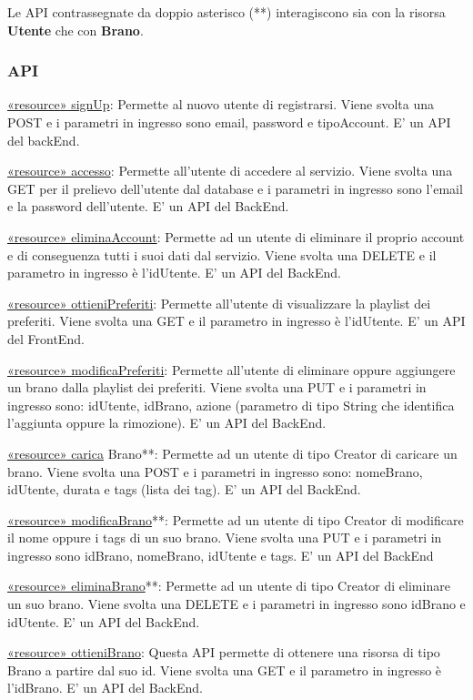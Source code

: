 \documentclass[a4paper,12pt]{article}
\begin{document}
Le API contrassegnate da doppio asterisco (**) interagiscono sia con la risorsa \textbf{Utente} che con \textbf{Brano}.

\subsubsection*{API}

\underline{«resource» signUp}: Permette al nuovo utente di registrarsi. Viene svolta una POST e i parametri in ingresso sono email, password e tipoAccount. E’ un API del backEnd.

\underline{«resource» accesso}: Permette all’utente di accedere al servizio. Viene svolta una GET per il prelievo dell’utente dal database e i parametri in ingresso sono l’email e la password dell’utente. E’ un API del BackEnd.

\underline{«resource» eliminaAccount}: Permette ad un utente di eliminare il proprio account e di conseguenza tutti i suoi dati dal servizio. Viene svolta una DELETE e il parametro in ingresso è l’idUtente. E’ un API del BackEnd.

\underline{«resource» ottieniPreferiti}: Permette all’utente di visualizzare la playlist dei preferiti. Viene svolta una GET e il parametro in ingresso è l’idUtente.  E’ un API del FrontEnd.

\underline{«resource» modificaPreferiti}: Permette all’utente di eliminare oppure aggiungere un brano dalla playlist dei preferiti. Viene svolta una PUT e i parametri in ingresso sono: idUtente, idBrano, azione (parametro di tipo String che identifica l’aggiunta oppure la rimozione). E’ un API del BackEnd.

\underline{«resource» carica} Brano**: Permette ad un utente di tipo Creator di caricare un brano. Viene svolta una POST e i parametri in ingresso sono: nomeBrano, idUtente, durata e tags (lista dei tag). E’ un API del BackEnd. 

\underline{«resource» modificaBrano}**: Permette ad un utente di tipo Creator di modificare il nome oppure i tags di un suo brano. Viene svolta una PUT e i parametri in ingresso sono idBrano, nomeBrano, idUtente e tags. E’ un API del BackEnd

\underline{«resource» eliminaBrano}**: Permette ad un utente di tipo Creator di eliminare un suo brano. Viene svolta una DELETE e i parametri in ingresso sono idBrano e idUtente.  E’ un API del BackEnd.

\underline{«resource» ottieniBrano}: Questa API permette di ottenere una risorsa di tipo Brano a partire dal suo id. Viene svolta una GET e il parametro in ingresso è l’idBrano. E’ un API del BackEnd.
\end{document}
